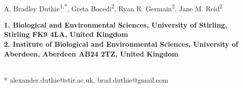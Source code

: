 \documentclass[10pt,letterpaper]{article}
\begin{document}
\vspace*{0.35in}

\begin{flushleft}
{\LARGE
\textbf{}
}
\newline
\\
A. Bradley Duthie\textsuperscript{1,*},
Greta Bocedi\textsuperscript{2},
Ryan R. Germain\textsuperscript{2},
Jane M. Reid\textsuperscript{2}
\\
\bigskip
\begin{small}
\bf{1.} Biological and Environmental Sciences, University of Stirling, Stirling FK9 4LA, United Kingdom \\
\bf{2.} Institute of Biological and Environmental Sciences, University of Aberdeen, Aberdeen AB24 2TZ, United Kingdom
\end{small}
\\
\bigskip
*  alexander.duthie@stir.ac.uk, brad.duthie@gmail.com

\end{flushleft}
\end{document}
